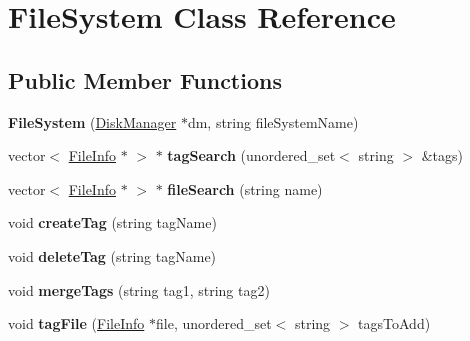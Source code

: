 \hypertarget{classFileSystem}{}\section{File\+System Class Reference}
\label{classFileSystem}
\subsection*{Public Member Functions}
\begin{DoxyCompactItemize}
\item 
\mbox{\label{classFileSystem_a3c9bf0d395385ca84319dcfaf9d005f4}} 
{\bfseries File\+System} (\mbox{\hyperlink{classDiskManager}{Disk\+Manager}} $\ast$dm, string file\+System\+Name)
\item 
\mbox{\label{classFileSystem_afa5afeedec00348c8d1ab922dac9b086}} 
vector$<$ \mbox{\hyperlink{classFileInfo}{File\+Info}} $\ast$ $>$ $\ast$ {\bfseries tag\+Search} (unordered\+\_\+set$<$ string $>$ \&tags)
\item 
\mbox{\label{classFileSystem_aaa02d1a13bb71582a2a4268d32cba5b6}} 
vector$<$ \mbox{\hyperlink{classFileInfo}{File\+Info}} $\ast$ $>$ $\ast$ {\bfseries file\+Search} (string name)
\item 
\mbox{\label{classFileSystem_abbfcd839f871fe07c49de3d8b18045da}} 
void {\bfseries create\+Tag} (string tag\+Name)
\item 
\mbox{\label{classFileSystem_a551828d32231172c1a5099ade343c8ed}} 
void {\bfseries delete\+Tag} (string tag\+Name)
\item 
\mbox{\label{classFileSystem_ad631369beaeeb64657756d17deaa5ca5}} 
void {\bfseries merge\+Tags} (string tag1, string tag2)
\item 
\mbox{\label{classFileSystem_a94f949610e3011c15bf683db760ce9a5}} 
void {\bfseries tag\+File} (\mbox{\hyperlink{classFileInfo}{File\+Info}} $\ast$file, unordered\+\_\+set$<$ string $>$ tags\+To\+Add)
\item 
\mbox{\label{classFileSystem_a04dae702272527472dc78846da3f13b2}} 

\end{DoxyCompactItemize}
